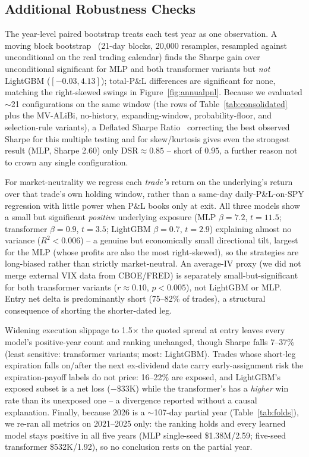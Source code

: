 \documentclass[sigconf,review]{acmart}
\begin{document}
\subsection{Additional Robustness Checks}
\label{sec:addl-robustness}
The year-level paired bootstrap treats each test year as one observation. A moving block bootstrap~\cite{kunsch1989} (21-day blocks, 20{,}000 resamples, resampled against unconditional on the real trading calendar) finds the Sharpe gain over unconditional significant for MLP and both transformer variants but \emph{not} LightGBM ($[-0.03, 4.13]$); total-P\&L differences are significant for none, matching the right-skewed swings in Figure~\ref{fig:annualpnl}. Because we evaluated $\sim$21 configurations on the same window (the rows of Table~\ref{tab:consolidated} plus the MV-ALiBi, no-history, expanding-window, probability-floor, and selection-rule variants), a Deflated Sharpe Ratio~\cite{bailey2014deflated} correcting the best observed Sharpe for this multiple testing and for skew/kurtosis gives even the strongest result (MLP, Sharpe 2.60) only $\text{DSR}\approx0.85$ -- short of $0.95$, a further reason not to crown any single configuration.

For market-neutrality we regress each \emph{trade's} return on the underlying's return over that trade's own holding window, rather than a same-day daily-P\&L-on-SPY regression with little power when P\&L books only at exit. All three models show a small but significant \emph{positive} underlying exposure (MLP $\beta{=}7.2$, $t{=}11.5$; transformer $\beta{=}0.9$, $t{=}3.5$; LightGBM $\beta{=}0.7$, $t{=}2.9$) explaining almost no variance ($R^2<0.006$) -- a genuine but economically small directional tilt, largest for the MLP (whose profits are also the most right-skewed), so the strategies are long-biased rather than strictly market-neutral. An average-IV proxy (we did not merge external VIX data from CBOE/FRED) is separately small-but-significant for both transformer variants ($r\approx0.10$, $p<0.005$), not LightGBM or MLP. Entry net delta is predominantly short (75--82\% of trades), a structural consequence of shorting the shorter-dated leg.

Widening execution slippage to 1.5$\times$ the quoted spread at entry leaves every model's positive-year count and ranking unchanged, though Sharpe falls 7--37\% (least sensitive: transformer variants; most: LightGBM). Trades whose short-leg expiration falls on/after the next ex-dividend date carry early-assignment risk the expiration-payoff labels do not price: 16--22\% are exposed, and LightGBM's exposed subset is a net loss ($-\$33$K) while the transformer's has a \emph{higher} win rate than its unexposed one -- a divergence reported without a causal explanation. Finally, because 2026 is a $\sim$107-day partial year (Table~\ref{tab:folds}), we re-ran all metrics on 2021--2025 only: the ranking holds and every learned model stays positive in all five years (MLP single-seed \$1.38M/2.59; five-seed transformer \$532K/1.92), so no conclusion rests on the partial year.
\end{document}
